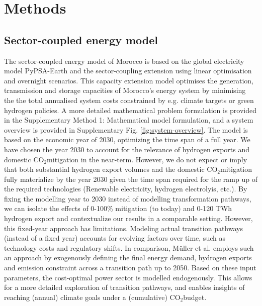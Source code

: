 \documentclass[5p,numafflabel]{elsarticle}
\newcommand{\co}{\ce{CO2}~}
\def\co{CO${}_2${\:}}
\begin{document}
\section*{Methods}
\label{sec:methods}

\subsection*{Sector-coupled energy model}
\label{subsec:moroccan_model}
The sector-coupled energy model of Morocco is based on the global electricity model  PyPSA-Earth \cite{Parzen2023} and the sector-coupling extension \cite{Abdel-Khalek2025} using linear optimisation and overnight scenarios. This capacity extension model optimises the generation, transmission and storage capacities of Morocco's energy system by minimising the the total annualised system costs constrained by e.g. climate targets or green hydrogen policies.
A more detailed mathematical problem formulation is provided in the Supplementary Method 1: Mathematical model formulation,
and a system overview is provided in Supplementary Fig. \ref{fig:system-overview}.
The model is based on the economic year of 2030, optimizing the time span of a full year. We have chosen the year 2030 to account for the relevance of hydrogen exports and domestic \co mitigation in the near-term. However, we do not expect or imply that both substantial hydrogen export volumes and the domestic \co mitigation fully materialize by the year 2030 given the time span required for the ramp up of the required technologies (Renewable electricity, hydrogen electrolyis, etc.). By fixing the modelling year to 2030 instead of modelling transformation pathways, we can isolate the effects of 0-100\% mitigation (to today) and 0-120 TWh hydrogen export and contextualize our results in a comparable setting.
However, this fixed-year approach has limitations. Modeling actual transition pathways (instead of a fixed year) accounts for evolving factors over time, such as technology costs and regulatory shifts. 
In comparison, M\"uller et al.\cite{Muller2024} employs such an  approach by exogenously defining the final energy demand, hydrogen exports and emission constraint across a transition path up to 2050. Based on these input parameters, the cost-optimal power sector is modelled endogenously. This allows for a more detailed exploration of transition pathways, and enables insights of reaching (annual) climate goals under a (cumulative) \co budget.
\end{document}
